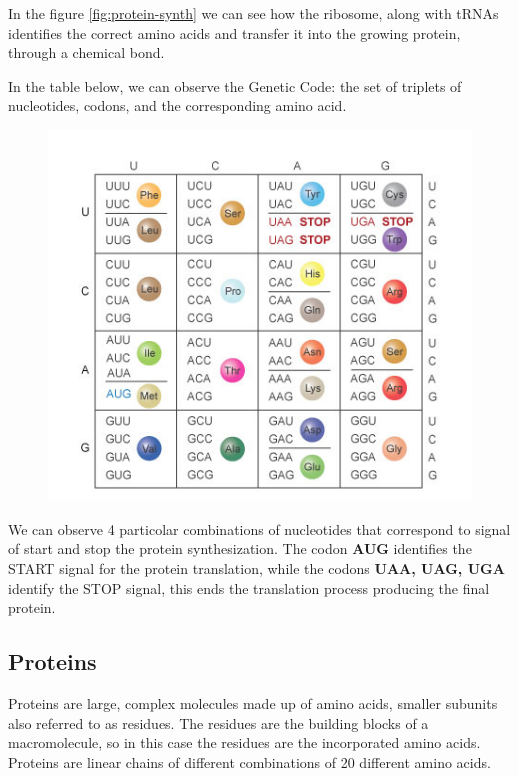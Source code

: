 In the figure \ref{fig:protein-synth} we can see how the ribosome, along with tRNAs identifies the correct amino acids and transfer it into the growing protein, through a chemical bond.

\pagebreak

In the table below, we can observe the Genetic Code: the set of triplets of nucleotides, codons, and the corresponding amino acid.

\begin{figure}[h!]
	\includegraphics[scale=1]{res/proteins_overview/genetic_code.png}
	\centering
	\label{fig:genetic-code}
\end{figure}

We can observe 4 particolar combinations of nucleotides that correspond to signal of start and stop the protein synthesization. The codon \textbf{AUG} identifies the START signal for the protein translation, while the codons \textbf{UAA, UAG, UGA} identify the STOP signal, this ends the translation process producing the final protein.

\pagebreak

\subsection{Proteins}
Proteins are large, complex molecules made up of amino acids, smaller subunits also referred to as residues. The residues are the building blocks of a macromolecule, so in this case the residues are the incorporated amino acids.
Proteins are linear chains of different combinations of 20 different amino acids. 

